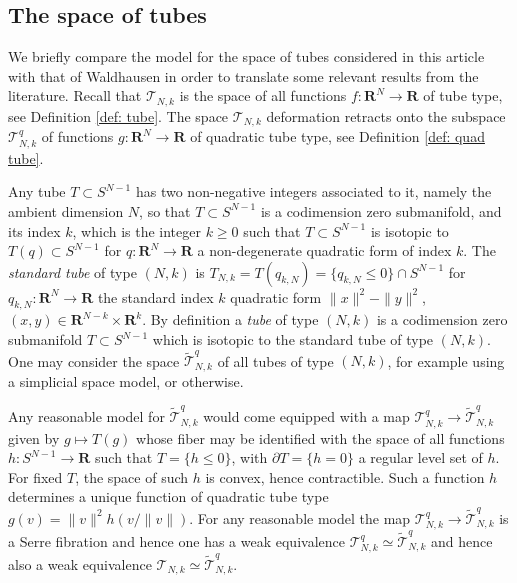 \documentclass{amsart}
\newcommand{\ki}[2]{{\color{green!80!black} #1
}{\color{blue!90!black}#2 
}}
\newcommand\cT{\mathcal{T}}
\def\bR{\mathbf{R}}
\theoremstyle{definition}
\theoremstyle{remark}
\newtheorem{inductive lemma}[theorem]{Inductive Lemma}
\begin{document}



\subsection{The space of tubes} \label{sec: SpaceOfTubes}


We briefly compare the model for the space of tubes considered in this article with that of Waldhausen \cite{W82} in order to translate some relevant results from the literature. Recall that $\cT_{N,k}$ is the space of all functions $f:\bR^N \to \bR$ of tube type, see Definition \ref{def: tube}. The space $\cT_{N,k}$ deformation retracts onto the subspace $\cT_{N,k}^q$ of functions $g:\bR^N \to \bR$ of quadratic tube type, see Definition \ref{def: quad tube}. 

Any tube $T \subset S^{N-1}$ has two non-negative integers associated to it, namely the ambient dimension $N$, so that $T \subset S^{N-1}$ is a codimension zero submanifold, and its index $k$, which is the integer $k\geq 0$ such that $T \subset S^{N-1}$ is isotopic to $T(q) \subset S^{N-1}$ for $q:\bR^N \to \bR$ a non-degenerate quadratic form of index $k$. The {\em standard tube} of type $(N,k)$ is $T_{N,k}=T(q_{k,N})=\{q_{k,N} \leq 0\} \cap S^{N-1}$ for $q_{k,N}:\bR^N \to \bR$ the standard index $k$ quadratic form $\|x\|^2-\|y\|^2$, $(x,y) \in \bR^{N-k} \times \bR^k$. By definition a {\em tube} of type $(N,k)$ is a codimension zero submanifold $T \subset S^{N-1}$ which is isotopic to the standard tube of type $(N,k)$. One may consider the space $\widetilde{\cT}^q_{N,k}$ of all tubes of type $(N,k)$, for example using a simplicial space model, or otherwise. 

Any reasonable model for $\widetilde{\cT}^q_{N,k}$ would come equipped with a map $\cT_{N,k}^q \to \widetilde{\cT}^q_{N,k}$ given by $g \mapsto T(g)$ whose fiber may be identified with the space of all functions $h:S^{N-1}\to \bR$ such that $T=\{ h \leq 0 \}$, with  $\partial T = \{ h=0 \}$ a regular level set of $h$. For fixed $T$, the space of such $h$ is convex, hence contractible. Such a function $h$ determines a unique function of quadratic tube type $g(v)=\|v\|^2h(v/\|v\|)$. For any reasonable model the map $\cT_{N,k}^q \to \widetilde{\cT}^q_{N,k}$ is a Serre fibration and hence  one has a weak equivalence $\cT_{N,k}^q \simeq \widetilde{\cT}^q_{N,k}$ and hence also a weak equivalence $\cT_{N,k} \simeq \widetilde{\cT}^q_{N,k}$.  
\end{document}
